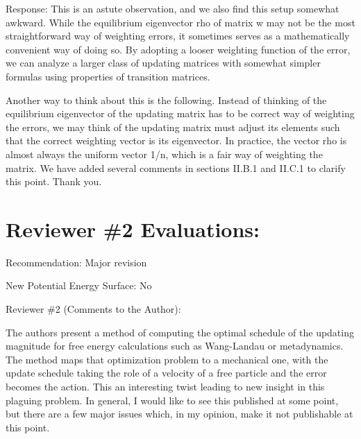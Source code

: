 \documentclass[preprint, superscriptaddress, floatfix]{revtex4-1}
\begin{document}
Response:
This is an astute observation, and we also find this setup somewhat awkward.
While the equilibrium eigenvector rho of matrix w may not be the most straightforward way of weighting errors, it sometimes serves as a mathematically convenient way of doing so.
By adopting a looser weighting function of the error, we can analyze a larger class of updating matrices with somewhat simpler formulas using properties of transition matrices.


Another way to think about this is the following.
Instead of thinking of the equilibrium eigenvector of the updating matrix has to be correct way of weighting the errors, we may think of the updating matrix must adjust its elements such that the correct weighting vector is its eigenvector.
In practice, the vector rho is almost always the uniform vector 1/n,
which is a fair way of weighting the matrix.
We have added several comments in sections II.B.1 and II.C.1 to clarify this point.
Thank you.



\section{Reviewer \#2 Evaluations:}

Recommendation: Major revision

New Potential Energy Surface: No

Reviewer \#2 (Comments to the Author):

The authors present a method of computing the optimal schedule of the updating magnitude for free energy calculations such as Wang-Landau or metadynamics. The method maps that optimization problem to a mechanical one, with the update schedule taking the role of a velocity of a free particle and the error becomes the action. This an interesting twist leading to new insight in this plaguing problem. In general, I would like to see this published at some point, but there are a few major issues which, in my opinion, make it not publishable at this point.
\end{document}
